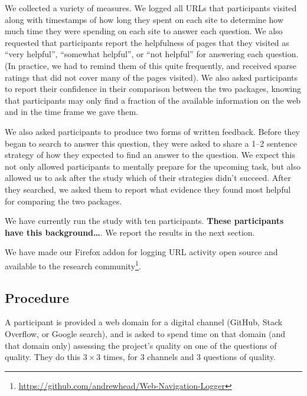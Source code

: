 We collected a variety of measures.
We logged all URLs that participants visited along with timestamps of how long they spent on each site to determine how much time they were spending on each site to answer each question.
We also requested that participants report the helpfulness of pages that they visited as ``very helpful'', ``somewhat helpful'', or ``not helpful'' for answering each question.
(In practice, we had to remind them of this quite frequently, and received sparse ratings that did not cover many of the pages visited).
We also asked participants to report their confidence in their comparison between the two packages, knowing that participants may only find a fraction of the available information on the web and in the time frame we gave them.

We also asked participants to produce two forms of written feedback.
Before they began to search to answer this question, they were asked to share a 1--2 sentence strategy of how they expected to find an answer to the question.
We expect this not only allowed participants to mentally prepare for the upcoming task, but also allowed us to ask after the study which of their strategies didn't succeed.
After they searched, we asked them to report what evidence they found most helpful for comparing the two packages.

We have currently run the study with ten participants.
\textbf{These participants have this background\ldots{}}.
We report the results in the next section.

We have made our Firefox addon for logging URL activity open source and available to the research community\footnote{\url{https://github.com/andrewhead/Web-Navigation-Logger}}.


\fi

\subsection{Procedure}

A participant is provided a web domain for a digital channel (GitHub, Stack Overflow, or Google search), and is asked to spend time on that domain (and that domain only) assessing the project's quality on one of the questions of quality.
They do this $3\times3$ times, for 3 channels and 3 questions of quality.

